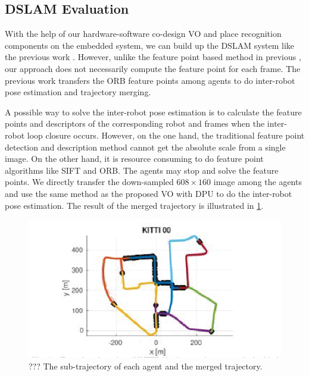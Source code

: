 \subsection{DSLAM Evaluation}

With the help of our hardware-software co-design VO and place recognition components on the embedded system, we can build up the DSLAM system like the previous work \cite{Cieslewski:20187ee}. However, unlike the feature point based method in previous \cite{Cieslewski:20187ee}, our approach does not necessarily compute the feature point for each frame. The previous work \cite{Cieslewski:20187ee} transfers the ORB feature points among agents to do inter-robot pose estimation and trajectory merging.


A possible way to solve the inter-robot pose estimation is to calculate the feature points and descriptors of the corresponding robot and frames when the inter-robot loop closure occurs. However, on the one hand, the traditional feature point detection and description method cannot get the absolute scale from a single image. On the other hand, it is resource consuming to do feature point algorithms like SIFT\cite{Jegou:2010f45} and ORB\cite{Mur-Artal:2017281}. The agents may stop and solve the feature points. We directly transfer the down-sampled $608 \times 160$ image among the agents and use the same method as the proposed VO with DPU to do the inter-robot pose estimation. The result of the merged trajectory is illustrated in \cref{fig:dslam}.


\begin{figure}[ht]
  \centering  
  \includegraphics[width=0.85\linewidth]{fig/dslam.eps}
  \caption{??? The sub-trajectory of each agent and the merged trajectory.}
  \label{fig:dslam}
\end{figure}

